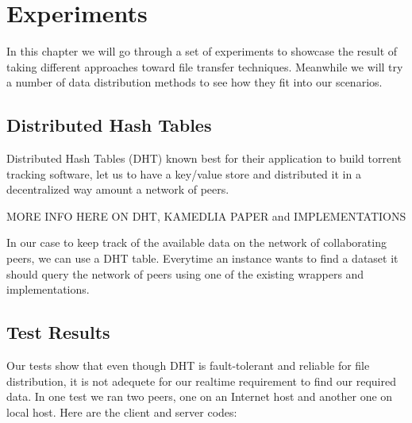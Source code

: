 \chapter{Experiments}
\label{cha:exp}

In this chapter we will go through a set of experiments to showcase the result of taking different approaches toward file transfer techniques. Meanwhile we will try a number of data distribution methods to see how they fit into our scenarios.

\section{Distributed Hash Tables}
Distributed Hash Tables (DHT) known best for their application to build torrent tracking software, let us to have a key/value store and distributed it in a decentralized way amount a network of peers.

MORE INFO HERE ON DHT, KAMEDLIA PAPER and IMPLEMENTATIONS

In our case to keep track of the available data on the network of collaborating peers, we can use a DHT table. Everytime an instance wants to find a dataset it should query the network of peers using one of the existing wrappers and implementations.

\section{Test Results}
Our tests show that even though DHT is fault-tolerant and reliable for file distribution, it is not adequete for our realtime requirement to find our required data. In one test we ran two peers, one on an Internet host and another one on local host. Here are the client and server codes:

